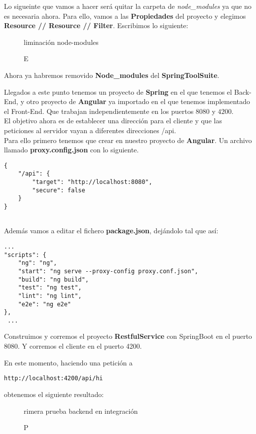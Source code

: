\documentclass[12pt,a4paper]{article}
\begin{document}
Lo sigueinte que vamos a hacer será quitar la carpeta de \textit{node\_modules} ya que no es necesaria ahora. Para ello, vamos a las \textbf{Propiedades} del proyecto y elegimos \textbf{Resource // Resource  // Filter}. Escribimos lo siguiente:


\begin{figure}[!h]
\centering
{}
\caption Eliminación node-modules
\label{itg3}
\end{figure}

Ahora ya habremos removido \textbf{Node\_modules} del \textbf{SpringToolSuite}.


Llegados a este punto tenemos un proyecto de \textbf{Spring} en el que tenemos el Back-End, y otro proyecto de \textbf{Angular} ya importado en el que tenemos implementado el Front-End. Que trabajan independientemente en los puertos $8080$ y $4200$.\\

El objetivo ahora es de establecer una dirección para el cliente y que las peticiones al servidor vayan a diferentes direcciones /api.\\

Para ello primero tenemos que crear en nuestro proyecto de \textbf{Angular}. Un archivo llamado \textbf{proxy.config.json} con lo siguiente.

\begin{verbatim}
{
	"/api": {
		"target": "http://localhost:8080",
		"secure": false
	}
}
    
\end{verbatim}

Además vamos a editar el fichero \textbf{package.json}, dejándolo tal que así:

\begin{verbatim}
...
"scripts": {
    "ng": "ng",
    "start": "ng serve --proxy-config proxy.conf.json",
    "build": "ng build",
    "test": "ng test",
    "lint": "ng lint",
    "e2e": "ng e2e"
},
 ...
\end{verbatim}

Construimos y corremos el proyecto \textbf{RestfulService} con SpringBoot en el puerto 8080. Y corremos el cliente en el puerto 4200.

En este momento, haciendo una petición a \begin{verbatim}http://localhost:4200/api/hi\end{verbatim} obtenemos el siguiente resultado:


\begin{figure}[!h]
\centering
{}
\caption Primera prueba backend en integración
\label{itg4}
\end{figure}
\end{document}
